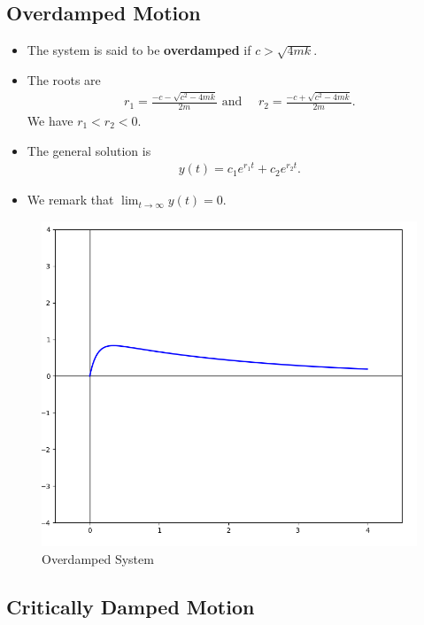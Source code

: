 \documentclass[12pt,a4paper]{article}
\newcommand{\ra}{\rightarrow}
\begin{document}
	\newpage
	
	\subsection{Overdamped Motion}
	\begin{itemize}
	\item The system is said to be \textbf{overdamped} if $c > \sqrt{4mk}$. 
	\item The roots are 
		\begin{align*}
		r_1 = \frac{-c - \sqrt{c^2 - 4mk}}{2m} \text{ and } \quad r_2 = \frac{-c + \sqrt{c^2 - 4mk}}{2m} .
		\end{align*}
	We have $r_1 < r_2 < 0$.
	\item The general solution is
		\begin{align*}
		y(t) = c_1 e^{r_1 t} + c_2 e^{r_2 t} .
		\end{align*}
	\item We remark that $\lim_{t \ra \infty} y(t) = 0$.
	\end{itemize}
	
	\begin{figure}[h]
	\centering
	\includegraphics[scale=0.5]{fig5.png}
	\caption{Overdamped System}
	\end{figure}
	
	\newpage
	
	\subsection{Critically Damped Motion}
	
\end{document}
